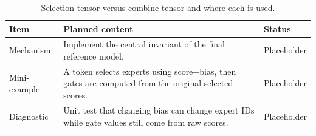 \begin{table}[H]
\centering
\caption{Selection tensor versus combine tensor and where each is used.}
\label{tab:ch09-biased-selection-and-unbiased-combine}
\begin{tabularx}{\textwidth}{p{}X p{}}
\toprule
Item & Planned content & Status \\
\midrule
Mechanism & Implement the central invariant of the final reference model. & Placeholder \\
Mini-example & A token selects experts using score+bias, then gates are computed from the original selected scores. & Placeholder \\
Diagnostic & Unit test that changing bias can change expert IDs while gate values still come from raw scores. & Placeholder \\
\bottomrule
\end{tabularx}
\end{table}
